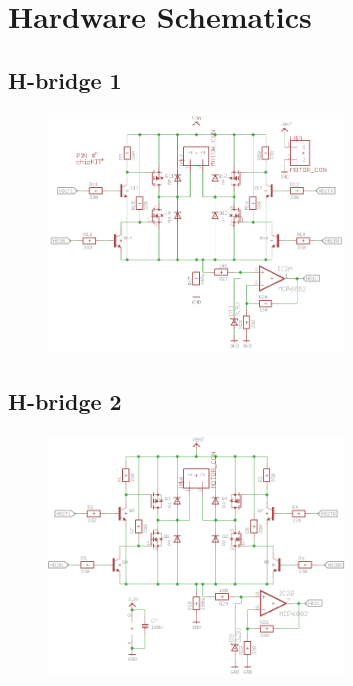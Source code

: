 \section{Hardware Schematics}

\subsection{H-bridge 1}
\begin{figure}[!ht]
	\centering
	\includegraphics[width=0.7\textwidth]{figures/HB1.PNG}
	\caption{}
	\label{Hardware diagram}
\end{figure}

\subsection{H-bridge 2}
\begin{figure}[!ht]
	\centering
	\includegraphics[width=0.7\textwidth]{figures/HB2.PNG}
	\caption{}
	\label{Hardware diagram}
\end{figure}

